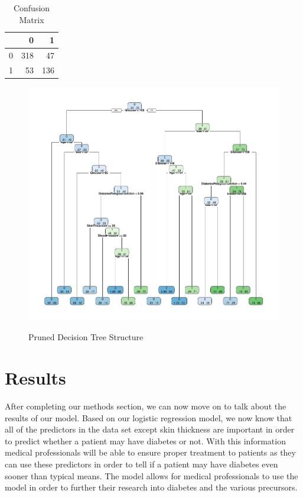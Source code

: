\documentclass[12pt]{article}
\begin{document}
\begin{table}[ht]
  \centering
  \caption{Confusion Matrix} 
  \begin{tabular}{rrr}
    \toprule
    & 0 & 1 \\ 
    \midrule
  0 & 318 & 47 \\ 
    1 & 53 & 136 \\ 
    \bottomrule
  \end{tabular}
  \label{tab:conf_matrix}
  \end{table}

\begin{figure}[tbp]
  \centering
  \caption{Pruned Decision Tree Structure}
  \includegraphics[width=\textwidth]{Pruned_tree.pdf}
  \label{fig:prstructure}
  \end{figure}

\section{Results}
\label{sec:resu}

After completing our methods section, we can now move on to talk about the results of our model. Based on our logistic regression model, 
we now know that all of the predictors in the data set except skin thickness are important in order to predict whether a patient may have 
diabetes or not. With this information medical professionals will be able to ensure proper treatment to patients as they can use these 
predictors in order to tell if a patient may have diabetes even sooner than typical means. The model allows for medical professionals to 
use the model in order to further their research into diabetes and the various precursors.
\end{document}

